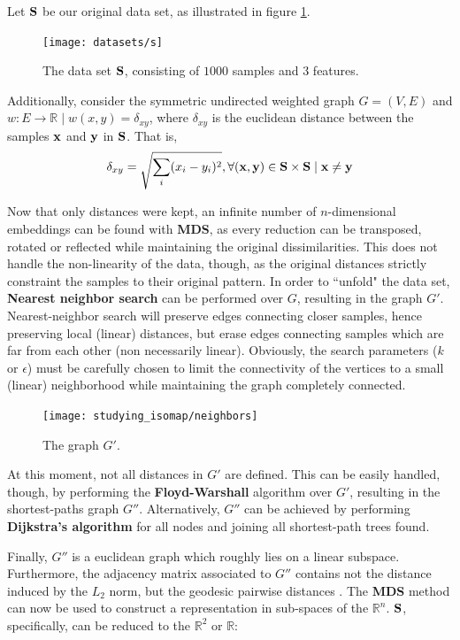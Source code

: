 Let $\mathbf{S}$ be our original data set, as illustrated in figure \ref{fig:mani_s}.

\begin{figure}[H]
	\centering
	\captionsetup{justification=centering}
	\texttt{[image: datasets/s]}
	\caption{The data set $\mathbf{S}$, consisting of $1000$ samples and $3$ features.}
	\label{fig:mani_s}
\end{figure}

Additionally, consider the symmetric undirected weighted graph $G=(V, E)$ and $w \colon E \to \mathbb{R} \mid w(x, y) = \delta_{xy}$, where $\delta_{xy}$ is the euclidean distance between the samples $\mathbf{x}$ and $\mathbf{y}$ in $\mathbf{S}$. That is,
$$\delta_{xy} = \sqrt{\sum_{i} (x_i - y_i)^2}, \forall (\mathbf{x}, \mathbf{y}) \in \mathbf{S} \times \mathbf{S} \mid \mathbf{x} \ne \mathbf{y}$$

Now that only distances were kept, an infinite number of $n$-dimensional embeddings can be found with \textbf{MDS}, as every reduction can be transposed, rotated or reflected while maintaining the original dissimilarities. This does not handle the non-linearity of the data, though, as the original distances strictly constraint the samples to their original pattern. In order to ``unfold" the data set, \textbf{Nearest neighbor search} can be performed over $G$, resulting in the graph $G'$. Nearest-neighbor search will preserve edges connecting closer samples, hence preserving local (linear) distances, but erase edges connecting samples which are far from each other (non necessarily linear). Obviously, the search parameters ($k$ or $\epsilon$) must be carefully chosen to limit the connectivity of the vertices to a small (linear) neighborhood while maintaining the graph completely connected.

\begin{figure}[H]
	\centering
	\captionsetup{justification=centering}
	\texttt{[image: studying\_isomap/neighbors]}
	\caption{The graph $G'$.}
	\label{fig:mani_s_graph_h}
\end{figure}

At this moment, not all distances in $G'$ are defined. This can be easily handled, though, by performing the \textbf{Floyd-Warshall} algorithm over $G'$, resulting in the shortest-paths graph $G''$. Alternatively, $G''$ can be achieved by performing \textbf{Dijkstra's algorithm} for all nodes and joining all shortest-path trees found.

Finally, $G''$ is a euclidean graph which roughly lies on a linear subspace. Furthermore, the adjacency matrix associated to $G''$ contains not the distance induced by the $L_2$ norm, but the geodesic pairwise distances \cite{gho2006}. The \textbf{MDS} method can now be used to construct a representation in sub-spaces of the $\mathbb{R}^n$. $\mathbf{S}$, specifically, can be reduced to the $\mathbb{R}^2$ or $\mathbb{R}$:

